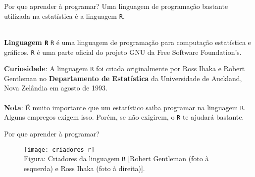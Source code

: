 \documentclass{beamer}
\begin{document}
\begin{frame}{Por que aprender à programar?}
Uma linguagem de programação bastante utilizada na estatística é a linguagem \texttt{R}.\\~\\

\begin{block}{\textbf{Linguagem \texttt{R}}}
\texttt{R} é uma linguagem de programação para computação estatística e gráficos. \texttt{R} é uma parte oficial do projeto GNU da Free Software Foundation's.   
\end{block}

\textbf{Curiosidade}: A linguagem \texttt{R} foi criada originalmente por Ross Ihaka e Robert Gentleman no \textbf{Departamento de Estatística} da Universidade de Auckland, Nova Zelândia em agosto de 1993.\\~\\
\textbf{Nota}: É muito importante que um estatístico saiba programar na linguagem \texttt{R}. Alguns empregos exigem isso. Porém, se não exigirem, o \texttt{R} te ajudará bastante.
\end{frame}

\begin{frame}{Por que aprender à programar?}
\begin{figure}[!htb]
	\centering
	\texttt{[image: criadores\_r]}\\
	Figura: Criadores da linguagem \texttt{R} [Robert Gentleman (foto à esquerda) e Ross Ihaka (foto à direita)].
\end{figure}
\end{frame}

\end{document}
